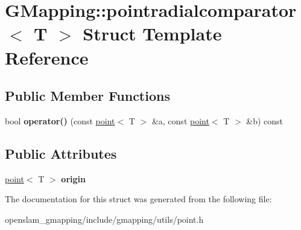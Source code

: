\hypertarget{structGMapping_1_1pointradialcomparator}{}\section{G\+Mapping\+:\+:pointradialcomparator$<$ T $>$ Struct Template Reference}
\label{structGMapping_1_1pointradialcomparator}
\subsection*{Public Member Functions}
\begin{DoxyCompactItemize}
\item 
\mbox{\label{structGMapping_1_1pointradialcomparator_a1804b5280042a9014285099fec87cdff}} 
bool {\bfseries operator()} (const \hyperlink{structGMapping_1_1point}{point}$<$ T $>$ \&a, const \hyperlink{structGMapping_1_1point}{point}$<$ T $>$ \&b) const
\end{DoxyCompactItemize}
\subsection*{Public Attributes}
\begin{DoxyCompactItemize}
\item 
\mbox{\label{structGMapping_1_1pointradialcomparator_a4e1f35f20e5f53230cd4d21306070926}} 
\hyperlink{structGMapping_1_1point}{point}$<$ T $>$ {\bfseries origin}
\end{DoxyCompactItemize}


The documentation for this struct was generated from the following file\+:\begin{DoxyCompactItemize}
\item 
openslam\+\_\+gmapping/include/gmapping/utils/point.\+h\end{DoxyCompactItemize}
